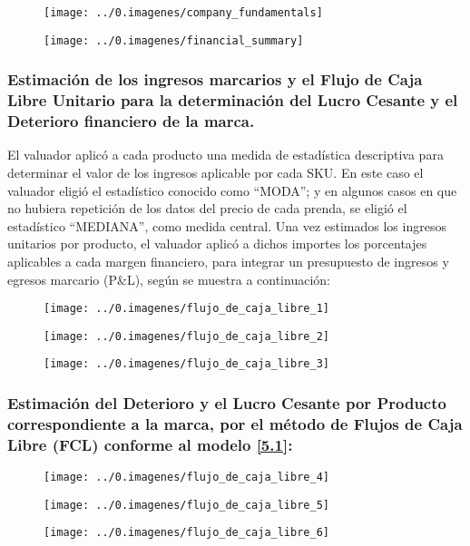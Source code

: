 \begin{figure}[H]
	\centering
	\texttt{[image: ../0.imagenes/company\_fundamentals]}
\end{figure}

\begin{figure}[H]
	\centering
	\texttt{[image: ../0.imagenes/financial\_summary]}
\end{figure}

\subsubsection{Estimación de los ingresos marcarios y el Flujo de Caja Libre Unitario para la determinación del Lucro Cesante y el Deterioro financiero de la marca.}

El valuador aplicó a cada producto una medida de estadística descriptiva para determinar el valor de los ingresos aplicable por cada SKU. En este caso el valuador eligió el estadístico conocido como ``MODA''; y en algunos casos en que no hubiera repetición de los datos del precio de cada  prenda,  se eligió el estadístico ``MEDIANA'', como medida central. Una vez estimados los ingresos unitarios por producto, el valuador aplicó a dichos importes los porcentajes aplicables a cada margen financiero, para integrar un presupuesto de ingresos y egresos marcario (P\&L), según se muestra a continuación:

\begin{figure}[H]
	\centering
	\texttt{[image: ../0.imagenes/flujo\_de\_caja\_libre\_1]}
\end{figure}

\begin{figure}[H]
	\centering
	\texttt{[image: ../0.imagenes/flujo\_de\_caja\_libre\_2]}
\end{figure}

\begin{figure}[H]
	\centering
	\texttt{[image: ../0.imagenes/flujo\_de\_caja\_libre\_3]}
\end{figure}

\subsubsection{Estimación del Deterioro y el Lucro Cesante por Producto correspondiente a la marca, por el método de Flujos de Caja Libre (FCL) conforme al modelo \ref{5.1}:}

\begin{figure}[H]
	\centering
	\texttt{[image: ../0.imagenes/flujo\_de\_caja\_libre\_4]}
\end{figure}

\begin{figure}[H]
	\centering
	\texttt{[image: ../0.imagenes/flujo\_de\_caja\_libre\_5]}
\end{figure}

\begin{figure}[H]
	\centering
	\texttt{[image: ../0.imagenes/flujo\_de\_caja\_libre\_6]}
\end{figure}
